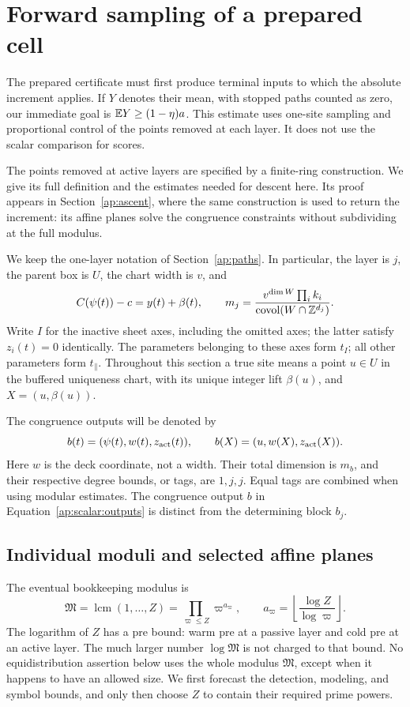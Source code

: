 \section{Forward sampling of a prepared cell}
\label{ap:scalar}

The prepared certificate must first produce terminal inputs to which
the absolute increment applies.  If $Y$ denotes their mean, with
stopped paths counted as zero, our immediate goal is
$\mathbb E Y\ge(1-\eta)a$.  This estimate uses one-site sampling and
proportional control of the points removed at each layer.  It does not
use the scalar comparison for scores.

The points removed at active layers are specified by a finite-ring
construction.  We give its full definition and the estimates needed
for descent here.  Its proof appears in Section~\ref{ap:ascent},
where the same construction is used to return the increment: its
affine planes solve the congruence constraints without subdividing
at the full modulus.

We keep the one-layer notation of Section~\ref{ap:paths}. In particular,
the layer is $j$, the parent box is $U$, the chart width is $v$, and
\[
 C(\psi(t))-c=y(t)+\beta(t),\qquad
 m_j=\frac{v^{\dim W}\prod_i k_i}{\operatorname{covol}(W\cap\mathbb Z^{d_j})}.
\]
Write $I$ for the inactive sheet axes, including the omitted axes;
the latter satisfy $z_i(t)=0$ identically. The parameters belonging to these
axes form $t_I$; all other parameters form $t_\parallel$. Throughout
this section a true site means a point $u\in U$ in the buffered
uniqueness chart, with its unique integer lift $\beta(u)$, and
$X=(u,\beta(u))$.

The congruence outputs will be denoted by
\begin{equation}\label{ap:scalar:outputs}
 b(t)=(\psi(t),w(t),z_{\rm act}(t)),\qquad
 b(X)=(u,w(X),z_{\rm act}(X)).
\end{equation}
Here $w$ is the deck coordinate, not a width. Their total dimension is
$m_b$, and their respective degree bounds, or tags, are $1,j,j$.
Equal tags are combined when using modular estimates. The congruence
output $b$ in Equation~\eqref{ap:scalar:outputs} is distinct from
the determining block $b_j$.

\subsection{Individual moduli and selected affine planes}

The eventual bookkeeping modulus is
\begin{equation}\label{ap:scalar:large-modulus}
 \mathfrak M=\operatorname{lcm}(1,\ldots,Z)
       =\prod_{\varpi\le Z}\varpi^{a_\varpi},\qquad
 a_\varpi=\left\lfloor\frac{\log Z}{\log\varpi}\right\rfloor.
\end{equation}
The logarithm of $Z$ has a pre bound: warm pre at a passive layer and
cold pre at an active layer. The much larger number $\log\mathfrak M$
is not charged to that bound. No equidistribution assertion below uses
the whole modulus $\mathfrak M$, except when it happens to have an
allowed size. We first forecast the detection, modeling, and symbol
bounds, and only then choose $Z$ to contain their required prime powers.

